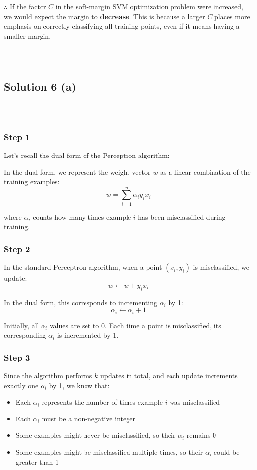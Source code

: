 \documentclass{article}
\begin{document}
\subsubsection*{\normalfont}{$\therefore$ If the factor $C$ in the soft-margin SVM optimization problem were increased, we would expect the margin to \textbf{decrease}. This is because a larger $C$ places more emphasis on correctly classifying all training points, even if it means having a smaller margin.}

\noindent\rule{\textwidth}{0.4pt}\\

\newpage

\subsection*{Solution 6 (a)}
\noindent\rule{\textwidth}{0.4pt}\\

\subsubsection*{Step 1}
\parbox{\textwidth}{
Let's recall the dual form of the Perceptron algorithm:

In the dual form, we represent the weight vector $w$ as a linear combination of the training examples:
$$w = \sum_{i=1}^{n} \alpha_i y_i x_i$$

where $\alpha_i$ counts how many times example $i$ has been misclassified during training.
}

\subsubsection*{Step 2}
\parbox{\textwidth}{
In the standard Perceptron algorithm, when a point $(x_i, y_i)$ is misclassified, we update:
$$w \leftarrow w + y_i x_i$$

In the dual form, this corresponds to incrementing $\alpha_i$ by 1:
$$\alpha_i \leftarrow \alpha_i + 1$$

Initially, all $\alpha_i$ values are set to 0. Each time a point is misclassified, its corresponding $\alpha_i$ is incremented by 1.
}

\subsubsection*{Step 3}
\parbox{\textwidth}{
Since the algorithm performs $k$ updates in total, and each update increments exactly one $\alpha_i$ by 1, we know that:

\begin{itemize}
    \item Each $\alpha_i$ represents the number of times example $i$ was misclassified
    \item Each $\alpha_i$ must be a non-negative integer
    \item Some examples might never be misclassified, so their $\alpha_i$ remains 0
    \item Some examples might be misclassified multiple times, so their $\alpha_i$ could be greater than 1
\end{itemize}
}
\end{document}
